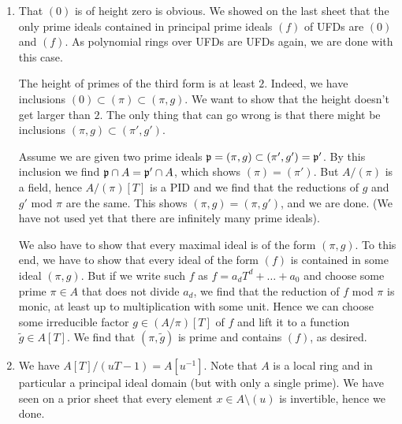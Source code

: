 \documentclass[a4paper,11pt]{article}
\begin{document}
\begin{enumerate}
    \item That $(0)$ is of height zero is obvious. We showed on the last sheet
        that the only prime ideals contained in principal prime ideals 
        $(f)$ of UFDs are $(0)$ and $(f)$. As polynomial rings over UFDs are 
        UFDs again, we are done with this case. 

        The height of primes of the third form is at least $2$. Indeed, we have
        inclusions $(0) \subset (\pi) \subset (\pi, g)$. We want to show that
        the height doesn't get larger than $2$. The only thing that can go
        wrong is that there might be inclusions 
        $(\pi, g) \subset (\pi',g')$. 

        Assume we are given two prime ideals $ \mathfrak{p} = (\pi, g) \subset (\pi',
        g') = \mathfrak{p}'$. By this inclusion we find $\mathfrak{p} \cap A = \mathfrak{p}' \cap A$, 
        which shows $(\pi) = (\pi')$. But 
        $A/(\pi)$ is a field, hence $A/(\pi)[T]$ is a PID and we find that 
        the reductions of $g$ and $g'$ mod $\pi$ are the same. This shows 
        $(\pi, g) = (\pi, g')$, and we are done. (We have not used yet that 
        there are infinitely many prime ideals).

        We also have to show that every maximal ideal is of the form $(\pi, g)$. 
        To this end, we have to show that every ideal of the form $(f)$ is
        contained in some ideal $(\pi, g)$. But if we write such $f$ 
        as $f = a_d T^d + \dots + a_0$ and choose some prime $\pi \in A$ 
        that does not divide $a_d$, we find that the reduction of $f$ mod $\pi$
        is monic, at least up to multiplication with some unit. Hence we can 
        choose some irreducible factor $g \in (A/\pi)[T]$ of $f$ and lift
        it to a function $\tilde g \in A[T]$. We find that $(\pi, \tilde g)$ 
        is prime and contains $(f)$, as desired. 
        
    \item We have $A[T]/(uT-1) = A[u^{-1}]$. Note that $A$ is a local ring and in
        particular a principal ideal domain (but with only a single prime). 
        We have seen on a prior sheet that every element $x \in A \setminus (u)$
        is invertible, hence we done. 
\end{enumerate}
\end{document}
